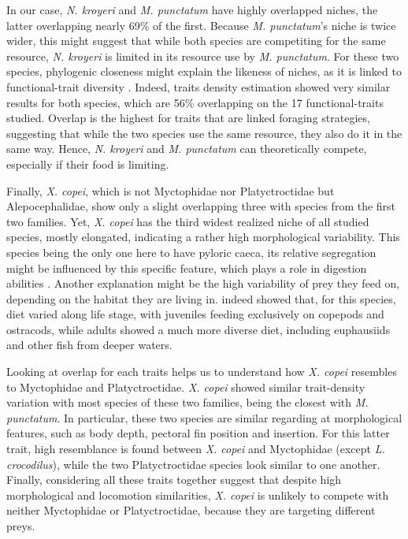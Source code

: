 In our case, \textit{N. kroyeri} and \textit{M. punctatum} have highly overlapped niches, the latter overlapping nearly 69\% of the first. Because \textit{M. punctatum}'s niche is twice wider, this might suggest that while both species are competiting for the same resource, \textit{N. kroyeri} is limited in its resource use by \textit{M. punctatum}. For these two species, phylogenic closeness might explain the likeness of niches, as it is linked to functional-trait diversity \citep{tucker2018}. Indeed, traits density estimation showed very similar results for both species, which are 56\% overlapping on the 17 functional-traits studied. Overlap is the highest for traits that are linked foraging strategies, suggesting that while the two species use the same resource, they also do it in the same way. Hence, \textit{N. kroyeri} and \textit{M. punctatum} can theoretically compete, especially if their food is limiting.

Finally, \textit{X. copei}, which is not Myctophidae nor Platyctroctidae but Alepocephalidae, show only a slight overlapping three with species from the first two families. Yet, \textit{X. copei} has the third widest realized niche of all studied species, mostly elongated, indicating a rather high morphological variability. This species being the only one here to have pyloric caeca, its relative segregation might be influenced by this specific feature, which plays a role in digestion abilities \citep{buddington1986}. Another explanation might be the high variability of prey they feed on, depending on the habitat they are living in. \citet{mauchline1983} indeed showed that, for this species, diet varied along life stage, with juveniles feeding exclusively on copepods and ostracods, while adults showed a much more diverse diet, including euphausiids and other fish from deeper waters. 

Looking at overlap for each traits helps us to understand how \textit{X. copei} resembles to Myctophidae and Platyctroctidae. \textit{X. copei} showed similar trait-density variation with most species of these two families, being the closest with \textit{M. punctatum}. In particular, these two species are similar regarding at morphological features, such as body depth, pectoral fin position and insertion. For this latter trait, high resemblance is found between \textit{X. copei} and Myctophidae (except \textit{L. crocodilus}), while the two Platyctroctidae species look similar to one another. Finally, considering all these traits together suggest that despite high morphological and locomotion similarities, \textit{X. copei} is unlikely to compete with neither Myctophidae or Platyctroctidae, because they are targeting different preys. \\

